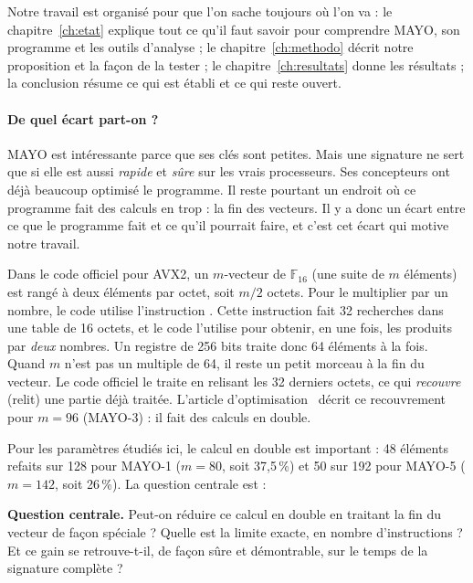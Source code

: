 Notre travail est organisé pour que l'on sache toujours où l'on va : le chapitre~\ref{ch:etat} explique tout ce qu'il faut savoir pour comprendre MAYO, son programme et les outils d'analyse ; le chapitre~\ref{ch:methodo} décrit notre proposition et la façon de la tester ; le chapitre~\ref{ch:resultats} donne les résultats ; la conclusion résume ce qui est établi et ce qui reste ouvert.

\paragraph{De quel écart part-on ?} MAYO est intéressante parce que ses clés sont petites. Mais une signature ne sert que si elle est aussi \emph{rapide} et \emph{sûre} sur les vrais processeurs. Ses concepteurs ont déjà beaucoup optimisé le programme. Il reste pourtant un endroit où ce programme fait des calculs en trop : la fin des vecteurs. Il y a donc un écart entre ce que le programme fait et ce qu'il pourrait faire, et c'est cet écart qui motive notre travail.

Dans le code officiel pour AVX2, un $m$-vecteur de $\mathbb{F}_{16}$ (une suite de $m$ éléments) est rangé à deux éléments par octet, soit $m/2$ octets. Pour le multiplier par un nombre, le code utilise l'instruction \vpshufb{}. Cette instruction fait 32 recherches dans une table de 16 octets, et le code l'utilise pour obtenir, en une fois, les produits par \emph{deux} nombres. Un registre de 256 bits traite donc 64 éléments à la fois. Quand $m$ n'est pas un multiple de 64, il reste un petit morceau à la fin du vecteur. Le code officiel le traite en relisant les 32 derniers octets, ce qui \emph{recouvre} (relit) une partie déjà traitée. L'article d'optimisation~\cite{nibbling} décrit ce recouvrement pour $m=96$ (MAYO-3) : il fait des calculs en double.

Pour les paramètres étudiés ici, le calcul en double est important : 48 éléments refaits sur 128 pour MAYO-1 ($m=80$, soit 37,5\,\%) et 50 sur 192 pour MAYO-5 ($m=142$, soit 26\,\%). La question centrale est :

\begin{encadre}
\textbf{Question centrale.} Peut-on réduire ce calcul en double en traitant la fin du vecteur de façon spéciale ? Quelle est la limite exacte, en nombre d'instructions \vpshufb{} ? Et ce gain se retrouve-t-il, de façon sûre et démontrable, sur le temps de la signature complète ?
\end{encadre}


